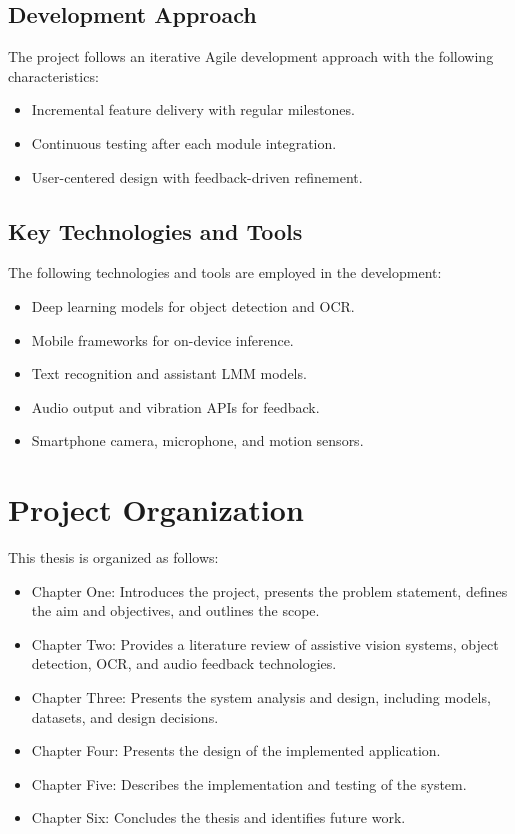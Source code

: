 \documentclass[12pt,a4paper]{report}
\begin{document}
\subsection{Development Approach}

The project follows an iterative Agile development approach with the following characteristics:

\begin{itemize}
  \item Incremental feature delivery with regular milestones.
  \item Continuous testing after each module integration.
  \item User-centered design with feedback-driven refinement.
\end{itemize}

\subsection{Key Technologies and Tools}

The following technologies and tools are employed in the development:

\begin{itemize}
  \item Deep learning models for object detection and OCR.
  \item Mobile frameworks for on-device inference.
  \item Text recognition and assistant LMM models.
  \item Audio output and vibration APIs for feedback.
  \item Smartphone camera, microphone, and motion sensors.
\end{itemize}

\section{Project Organization}

This thesis is organized as follows:

\begin{itemize}
  \item Chapter One: Introduces the project, presents the problem statement, defines the aim and objectives, and outlines the scope.
  \item Chapter Two: Provides a literature review of assistive vision systems, object detection, OCR, and audio feedback technologies.
  \item Chapter Three: Presents the system analysis and design, including models, datasets, and design decisions.
  \item Chapter Four: Presents the design of the implemented application.
  \item Chapter Five: Describes the implementation and testing of the system.
  \item Chapter Six: Concludes the thesis and identifies future work.
\end{itemize}
\end{document}
